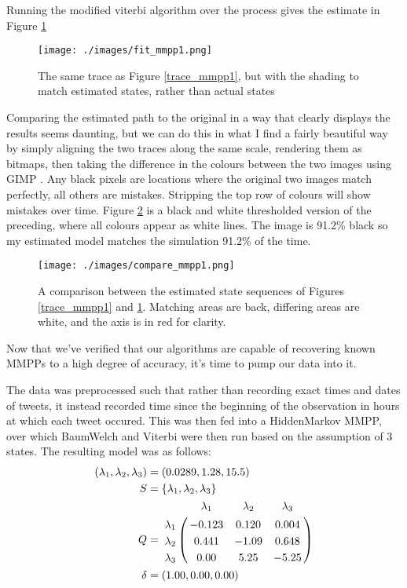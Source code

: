 Running the modified viterbi algorithm over the process gives the estimate in Figure \ref{fit_mmpp1}

\begin{figure}[h!]
\texttt{[image: ./images/fit\_mmpp1.png]}
\caption{The same trace as Figure \ref{trace_mmpp1}, but with the shading to match estimated states, rather than actual states}
\label{fit_mmpp1}
\end{figure}

Comparing the estimated path to the original in a way that clearly displays the results seems daunting, but we can do this in what I find a fairly beautiful way by simply aligning the two traces along the same scale, rendering them as bitmaps, then taking the difference in the colours between the two images using GIMP \cite[eqn 8.15]{gimpdocs}. Any black pixels are locations where the original two images match perfectly, all others are mistakes. Stripping the top row of colours will show mistakes over time. Figure \ref{compare_mmpp1} is a black and white thresholded version of the preceding, where all colours appear as white lines. The image is 91.2\% black so my estimated model matches the simulation 91.2\% of the time.

\begin{figure}[h!]
\texttt{[image: ./images/compare\_mmpp1.png]}
\caption{A comparison between the estimated state sequences of Figures \ref{trace_mmpp1} and \ref{fit_mmpp1}. Matching areas are back, differing areas are white, and the axis is in red for clarity.}
\label{compare_mmpp1}
\end{figure}

Now that we've verified that our algorithms are capable of recovering known MMPPs to a high degree of accuracy, it's time to pump our data into it.

The data was preprocessed such that rather than recording exact times and dates of tweets, it instead recorded time since the beginning of the observation in hours at which each tweet occured. This was then fed into a HiddenMarkov MMPP, over which BaumWelch and Viterbi were then run based on the assumption of 3 states. The resulting model was as follows:
\begin{align*}
(\lambda_1,\lambda_2,\lambda_3) &= (0.0289,1.28,15.5)\\
S &= \{\lambda_1,\lambda_2,\lambda_3\}\\
Q &= \bordermatrix{      & \lambda_1 & \lambda_2 & \lambda_3\cr
                \lambda_1 & -0.123 & 0.120 & 0.004 \cr
                \lambda_2 & 0.441 & -1.09 & 0.648 \cr
                \lambda_3 & 0.00 & 5.25 & -5.25 \cr
			}\\
\delta &= (1.00,0.00,0.00)
\end{align*}

